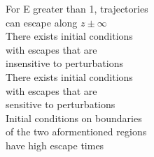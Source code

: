 \documentclass[preview]{standalone}
\begin{document}
For E greater than 1, trajectories\\can escape along $z\pm\infty$\\There exists initial conditions\\with escapes that are\\insensitive to perturbations\\There exists initial conditions\\with escapes that are\\sensitive to perturbations\\Initial conditions on boundaries\\of the two aformentioned regions\\have high escape times\\
\end{document}
